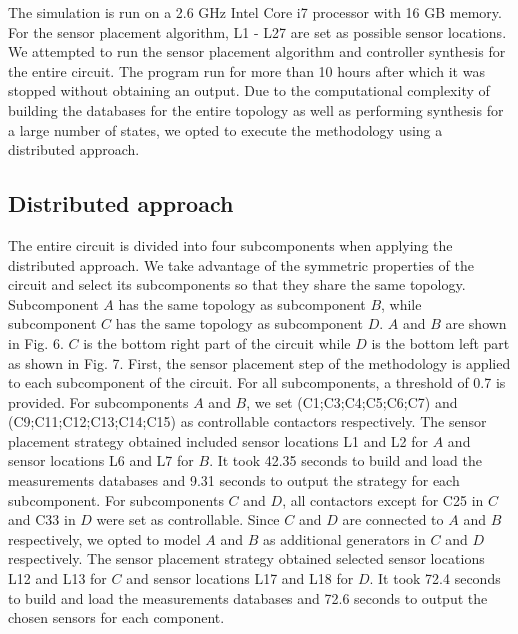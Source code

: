 \documentclass[journal]{IEEEtran}
\begin{document}
The simulation is run on a 2.6 GHz Intel Core i7 processor with 16 GB memory. For the sensor placement algorithm, L1 - L27 are set as possible sensor locations. We attempted to run the sensor placement algorithm and controller synthesis for the entire circuit. The program run for more than 10 hours after which it was stopped without obtaining an output. Due to the computational complexity of building the databases for the entire topology as well as performing synthesis for a large number of states, we opted to execute the methodology using a distributed approach. 

\subsection{Distributed approach}
The entire circuit is divided into four subcomponents when applying the distributed approach. We take advantage of the symmetric properties of the circuit and select its subcomponents so that they share the same topology. Subcomponent $A$ has the same topology as subcomponent $B$, while subcomponent $C$ has the same topology as subcomponent $D$. $A$ and $B$ are shown in Fig. 6. $C$ is the bottom right part of the circuit while $D$ is the bottom left part as shown in Fig. 7. First, the sensor placement step of the methodology is applied to each subcomponent of the circuit. For all subcomponents, a threshold of 0.7 is provided. For subcomponents $A$ and $B$, we set (C1;C3;C4;C5;C6;C7) and (C9;C11;C12;C13;C14;C15) as controllable contactors respectively. The sensor placement strategy obtained included sensor locations L1 and L2 for $A$ and sensor locations L6 and L7 for $B$. It took 42.35 seconds to build and load the measurements databases and 9.31 seconds to output the strategy for each subcomponent. For subcomponents $C$ and $D$, all contactors except for C25 in $C$ and C33 in $D$ were set as controllable. Since $C$ and $D$ are connected to $A$ and $B$ respectively, we opted to model $A$ and $B$ as additional generators in $C$ and $D$ respectively. The sensor placement strategy obtained selected sensor locations L12 and L13 for $C$ and sensor locations L17 and L18 for $D$. It took 72.4 seconds to build and load the measurements databases and 72.6 seconds to output the chosen sensors for each component.
\end{document}
